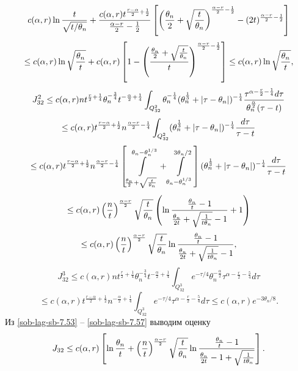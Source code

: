 $$
c(\alpha,r)\ln\frac{t}{\sqrt{t/\theta_n}}+{c(\alpha,r)t^{\frac{r-\alpha}{2}+\frac12}\over\frac{\alpha-r}{2}-\frac12}
\left[\left(\frac{\theta_n}{2}+\sqrt{\frac{t}{\theta_n}}\right)^{\frac{\alpha-r}{2}-\frac12}-(2t)^{\frac{\alpha-r}{2}-\frac12}\right]
$$
\begin{equation}\label{sob-lag-sb-7.55}
\le c(\alpha,r)\ln\sqrt{\frac{\theta_n}{t}}+c(\alpha,r)\left[1-\left({\frac{\theta_n}{2}+\sqrt{\frac{t}{\theta_n}}\over t}\right)^{\frac{\alpha-r}{2}-\frac12}\right]
 \le c(\alpha,r)\ln\sqrt{\frac{\theta_n}{t}},
\end{equation}
$$
J_{32}^2\le c(\alpha,r)nt^{\frac{r}{2}+\frac14}\theta_n^{-\frac34}t^{-\frac{\alpha}{2}+\frac14}
\int_{Q_{32}^2}\theta_n^{-\frac14}(\theta_n^{\frac13}+|\tau-\theta_n|)^{-\frac14}{\tau^{\alpha-\frac{r}{2}
-\frac14}d\tau\over\theta_n^{\frac{\alpha}2} (\tau-t)}
$$
$$
\le c(\alpha,r)t^{\frac{r-\alpha}{2}+\frac12}n^{\frac{\alpha-r}{2}-\frac14}
\int_{Q_{32}^2}(\theta_n^{\frac13}+|\tau-\theta_n|)^{-\frac14}{d\tau\over \tau-t}
$$
$$
\le c(\alpha,r)t^{\frac{r-\alpha}{2}+\frac12}n^{\frac{\alpha-r}{2}-\frac14}\left[
\int\limits_{\frac{\theta_n}{2}+\sqrt{\frac{t}{\theta_n}}}^{\theta_n-\theta_n^{1/3}}+
\int\limits_{\theta_n-\theta_n^{1/3}}^{3\theta_n/2}\right](\theta_n^{\frac13}+|\tau-\theta_n|)^{-\frac14}{d\tau\over \tau-t}
$$
$$
\le c(\alpha,r)\left(\frac{n}{t}\right)^{\frac{\alpha-r}{2}}\sqrt{\frac{t}{\theta_n}}
\left(\ln{\frac{\theta_n}{t}-1\over\frac{\theta_n}{2t}+\sqrt{\frac{1}{t\theta_n}}-1}+1\right)
$$
\begin{equation}\label{sob-lag-sb-7.56}
 \le c(\alpha,r)\left(\frac{n}{t}\right)^{\frac{\alpha-r}{2}}\sqrt{\frac{t}{\theta_n}}
\ln{\frac{\theta_n}{t}-1\over\frac{\theta_n}{2t}+\sqrt{\frac{1}{t\theta_n}}-1},
 \end{equation}
$$
J_{32}^3\le c(\alpha,r)nt^{\frac{r}{2}+\frac14}\theta_n^{-\frac34}t^{-\frac{\alpha}{2}+\frac14}
\int_{Q_{32}^3}e^{-\tau/4}\theta_n^{-\frac{\alpha}{2}}\tau^{\alpha-\frac{r}{2}-\frac54}d\tau
$$
\begin{equation}\label{sob-lag-sb-7.57}
\le c(\alpha,r)t^{\frac{r-\alpha}{2}+\frac12}n^{-\frac{\alpha}{2}+\frac14}
\int_{Q_{32}^3}e^{-\tau/4}\tau^{\alpha-\frac{r}{2}-\frac54}d\tau
 \le c(\alpha,r)e^{-3\theta_n/8}.
 \end{equation}
Из \eqref{sob-lag-sb-7.53} -- \eqref{sob-lag-sb-7.57} выводим оценку
\begin{equation}\label{sob-lag-sb-7.58}
J_{32} \le c(\alpha,r)\left[\ln\frac{\theta_n}{t}+\left(\frac{n}{t}\right)^{\frac{\alpha-r}{2}}\sqrt{\frac{t}{\theta_n}}
\ln{\frac{\theta_n}{t}-1\over\frac{\theta_n}{2t}-1+\sqrt{\frac{1}{t\theta_n}}}\right].
 \end{equation}
